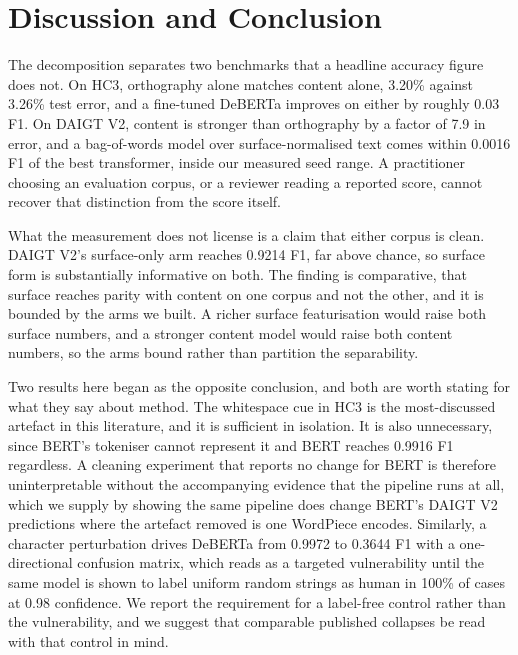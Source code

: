\section{Discussion and Conclusion}
\label{sec:limits}

The decomposition separates two benchmarks that a headline accuracy figure does not. On HC3, orthography alone matches content alone, 3.20\% against 3.26\% test error, and a fine-tuned DeBERTa improves on either by roughly 0.03 F1. On DAIGT V2, content is stronger than orthography by a factor of 7.9 in error, and a bag-of-words model over surface-normalised text comes within 0.0016 F1 of the best transformer, inside our measured seed range. A practitioner choosing an evaluation corpus, or a reviewer reading a reported score, cannot recover that distinction from the score itself.

What the measurement does not license is a claim that either corpus is clean. DAIGT V2's surface-only arm reaches 0.9214 F1, far above chance, so surface form is substantially informative on both. The finding is comparative, that surface reaches parity with content on one corpus and not the other, and it is bounded by the arms we built. A richer surface featurisation would raise both surface numbers, and a stronger content model would raise both content numbers, so the arms bound rather than partition the separability.

Two results here began as the opposite conclusion, and both are worth stating for what they say about method. The whitespace cue in HC3 is the most-discussed artefact in this literature, and it is sufficient in isolation. It is also unnecessary, since BERT's tokeniser cannot represent it and BERT reaches 0.9916 F1 regardless. A cleaning experiment that reports no change for BERT is therefore uninterpretable without the accompanying evidence that the pipeline runs at all, which we supply by showing the same pipeline does change BERT's DAIGT V2 predictions where the artefact removed is one WordPiece encodes. Similarly, a character perturbation drives DeBERTa from 0.9972 to 0.3644 F1 with a one-directional confusion matrix, which reads as a targeted vulnerability until the same model is shown to label uniform random strings as human in 100\% of cases at 0.98 confidence. We report the requirement for a label-free control rather than the vulnerability, and we suggest that comparable published collapses be read with that control in mind.

